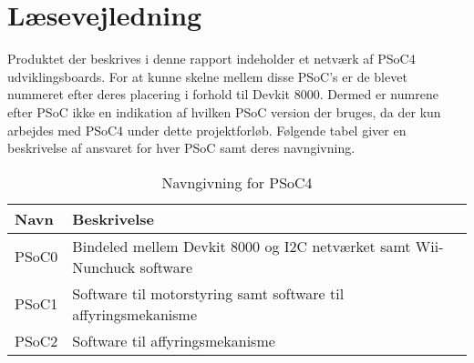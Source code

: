 \section{Læsevejledning}
Produktet der beskrives i denne rapport indeholder et netværk af PSoC4 udviklingsboards. For at kunne skelne mellem disse PSoC's er de blevet nummeret efter deres placering i forhold til Devkit 8000. Dermed er numrene efter PSoC ikke en indikation af hvilken PSoC version der bruges, da der kun arbejdes med PSoC4 under dette projektforløb. Følgende tabel giver en beskrivelse af ansvaret for hver PSoC samt deres navngivning.

\begin{table}[H]
	\centering
	\label{PSoCNavngivning}
	\begin{tabular}{|l|l|}
		\hline
		\textbf{Navn} & \textbf{Beskrivelse}                                                    \\ \hline
		PSoC0         & Bindeled mellem Devkit 8000 og I2C netværket samt Wii-Nunchuck software \\ \hline
		PSoC1         & Software til motorstyring samt software til affyringsmekanisme          \\ \hline
		PSoC2         & Software til affyringsmekanisme                                         \\ \hline
	\end{tabular}
	\caption{Navngivning for PSoC4}
\end{table}